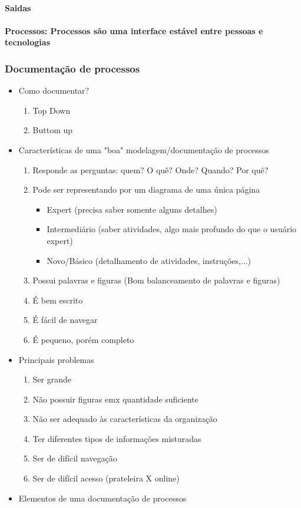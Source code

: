 \documentclass{article}
\begin{document}
	\paragraph{Saidas}

	\paragraph{Processos: Processos são uma interface estável entre pessoas e tecnologias}
\subsubsection{Documentação de processos}
	\begin{itemize}
	\item Como documentar? 
		\begin{enumerate}
		\item Top Down
		\item Buttom up	
		\end{enumerate}
	\item Características de uma "boa" modelagem/documentação de processos
		\begin{enumerate}
		\item Responde as perguntas: quem? O quê? Onde? Quando? Por quê?
		\item Pode ser representando por um diagrama de uma única página
			\begin{itemize}
			\item Expert (precisa saber somente alguns detalhes)
			\item Intermediário (saber atividades, algo mais profundo do que o usuário expert)
			\item Novo/Básico (detalhamento de atividades, instruções,...)
			\end{itemize}
		\item Possui palavras e figuras (Bom balanceamento de palavras e figuras)
		\item É bem escrito
		\item É fácil de navegar
		\item É pequeno, porém completo
		\end{enumerate}
	\item Principais problemas
		\begin{enumerate}
		\item Ser grande
		\item Não possuir figuras emx quantidade suficiente
		\item Não ser adequado às características da organização
		\item Ter diferentes tipos de informações misturadas
		\item Ser de difícil navegação
		\item Ser de difícil acesso (prateleira X online)
		\end{enumerate}
	\item Elementos de uma documentação de processos
	\end{itemize}
\end{document}
